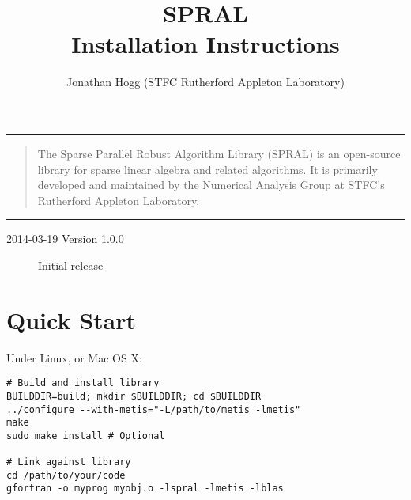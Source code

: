 \documentclass{spral}
\newcommand{\purpose}{
The Sparse Parallel Robust Algorithm Library (SPRAL) is an open-source library
for sparse linear algebra and related algorithms. It is primarily developed and
maintained by the Numerical Analysis Group at STFC's Rutherford Appleton Laboratory.
}
\begin{document}
\title{SPRAL \\Installation Instructions}
\author{Jonathan Hogg (STFC Rutherford Appleton Laboratory)}
\makeatletter
{}
\hfill
{\Huge \bfseries \textcolor{stfcblue}{\libraryname}}
\vspace{0.1cm}
\textcolor{stfcgrey}{\hrule}
\vspace{0.5cm}

\begin{center}
   \LARGE \bfseries
   \@title
\end{center}
\begin{quote}
   \large
   \purpose
\end{quote}

\begin{flushright}
\noindent
\@author
\end{flushright}
\vspace{-0.2cm}
\textcolor{stfcgrey}{\hrule}
\makeatother
\thispagestyle{firststyle}

\versionhistory
\begin{description}
\item[2014-03-19 Version 1.0.0] Initial release
\end{description}


\section{Quick Start}

Under Linux, or Mac OS X:

\begin{verbatim}
# Build and install library
BUILDDIR=build; mkdir $BUILDDIR; cd $BUILDDIR
../configure --with-metis="-L/path/to/metis -lmetis"
make
sudo make install # Optional

# Link against library
cd /path/to/your/code
gfortran -o myprog myobj.o -lspral -lmetis -lblas
\end{verbatim}
\end{document}
